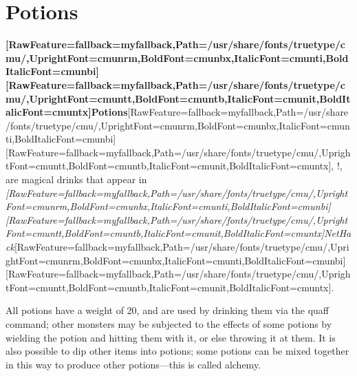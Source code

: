 \chapter{Potions}

{\bfseries \allowbreak{}\setmainfont{cmunbx.ttf}[RawFeature={fallback=myfallback},Path=/usr/share/fonts/truetype/cmu/,UprightFont=cmunrm,BoldFont=cmunbx,ItalicFont=cmunti,BoldItalicFont=cmunbi]\setmonofont{cmunbx.ttf}[RawFeature={fallback=myfallback},Path=/usr/share/fonts/truetype/cmu/,UprightFont=cmuntt,BoldFont=cmuntb,ItalicFont=cmunit,BoldItalicFont=cmuntx]\bfseries Potions}\allowbreak{}\setmainfont{cmunrm.ttf}[RawFeature={fallback=myfallback},Path=/usr/share/fonts/truetype/cmu/,UprightFont=cmunrm,BoldFont=cmunbx,ItalicFont=cmunti,BoldItalicFont=cmunbi]\setmonofont{cmunrm.ttf}[RawFeature={fallback=myfallback},Path=/usr/share/fonts/truetype/cmu/,UprightFont=cmuntt,BoldFont=cmuntb,ItalicFont=cmunit,BoldItalicFont=cmuntx], !, are magical\footnotemark[16] drinks that appear in {\itshape \allowbreak{}\setmainfont{cmunti.ttf}[RawFeature={fallback=myfallback},Path=/usr/share/fonts/truetype/cmu/,UprightFont=cmunrm,BoldFont=cmunbx,ItalicFont=cmunti,BoldItalicFont=cmunbi]\setmonofont{cmunti.ttf}[RawFeature={fallback=myfallback},Path=/usr/share/fonts/truetype/cmu/,UprightFont=cmuntt,BoldFont=cmuntb,ItalicFont=cmunit,BoldItalicFont=cmuntx]\itshape NetHack\footnotemark[17]}\allowbreak{}\setmainfont{cmunrm.ttf}[RawFeature={fallback=myfallback},Path=/usr/share/fonts/truetype/cmu/,UprightFont=cmunrm,BoldFont=cmunbx,ItalicFont=cmunti,BoldItalicFont=cmunbi]\setmonofont{cmunrm.ttf}[RawFeature={fallback=myfallback},Path=/usr/share/fonts/truetype/cmu/,UprightFont=cmuntt,BoldFont=cmuntb,ItalicFont=cmunit,BoldItalicFont=cmuntx].


All potions have a weight\footnotemark[18] of 20, and are used by drinking them via the quaff\footnotemark[19] command; other monsters may be subjected to the effects of some potions by wielding\footnotemark[20] the potion and hitting them with it, or else throwing\footnotemark[21] it at them. It is also possible to dip\footnotemark[22] other items into potions; some potions can be mixed together in this way to produce other potions{\mbox{$\text{---}$}}this is called alchemy\footnotemark[23]. 


